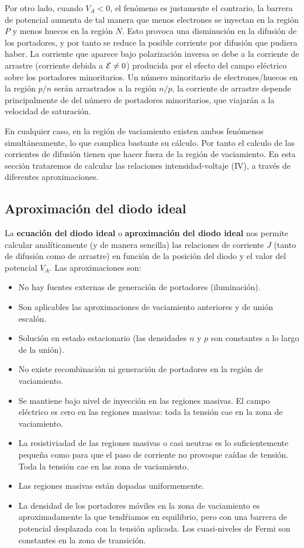 Por otro lado, cuando $V_A<0$, el fenómeno es justamente el contrario, la barrera de potencial aumenta de tal manera que menos electrones se inyectan en la región $P$ y menos huecos en la región $N$. Esto provoca una disminución en la difusión de los portadores, y por tanto se reduce la posible corriente por difusión que pudiera haber. La corriente que aparece bajo polarización inversa se debe a la corriente de arrastre (corriente debida a $\mathcal{E} \neq 0$) producida por el efecto del campo eléctrico sobre los portadores minoritarios. Un número minoritario de electrones/huecos en la región $p/n$ serán arrastrados a la región $n/p$, la corriente de arrastre depende principalmente de del número de portadores minoritarios, que viajarán a la velocidad de saturación. 

En cualquier caso, en la región de vaciamiento existen ambos fenómenos simultáneamente, lo que complica bastante su cálculo. Por tanto el calculo de las corrientes de difusión tienen que hacer fuera de la región de vaciamiento. En esta sección trataremos de calcular las relaciones intensidad-voltaje (IV), a través de diferentes aproximaciones.

\subsection{Aproximación del diodo ideal}

La \textbf{ecuación del diodo ideal} o \textbf{aproximación del diodo ideal} nos permite calcular analíticamente (y de manera sencilla) las relaciones de corriente $J$ (tanto de difusión como de arrastre) en función de la posición del diodo y el valor del potencial $V_A$. Las aproximaciones son:

\begin{itemize}
    \item No hay fuentes externas de generación de portadores (iluminación).
    \item Son aplicables las aproximaciones de vaciamiento anteriores y de unión escalón.
    \item Solución en estado estacionario (las densidades $n$ y $p$ son constantes a lo largo de la unión).
    \item No existe recombinación ni generación de portadores en la región de vaciamiento. 
    \item Se mantiene bajo nivel de inyección en las regiones masivas. El campo eléctrico es cero en las regiones masivas: toda la tensión cae en la zona de vaciamiento.
    \item La resistiviadad de las regiones masivas o casi neutras es lo suficientemente pequeña como para que el paso de corriente no provoque caídas de tensión. Toda la tensión cae en las zona de vaciamiento. 
    \item Las regiones masivas están dopadas uniformemente.
    \item La densidad de los portadores móviles en la zona de vaciamiento es aproximadamente la que tendŕiamos en equilibrio, pero con una barrera de potencial desplazada con la tensión aplicada. Los cuasi-niveles de Fermi son constantes en la zona de transición. 
\end{itemize}

